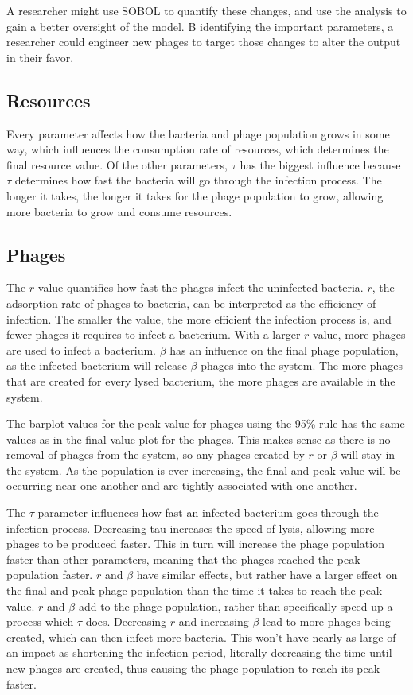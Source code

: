 A researcher might use SOBOL to quantify these changes, and use the analysis to gain a better oversight of the model. 
B identifying the important parameters, a researcher could engineer new phages to target those changes to alter the output in their favor. 

\subsection{Resources}
Every parameter affects how the bacteria and phage population grows in some way, which influences the consumption rate of resources, which determines the final resource value. 
Of the other parameters, $\tau$ has the biggest influence because $\tau$ determines how fast the bacteria will go through the infection process. 
The longer it takes, the longer it takes for the phage population to grow, allowing more bacteria to grow and consume resources. 



\subsection{Phages}
The $r$ value quantifies how fast the phages infect the uninfected bacteria. 
$r$, the adsorption rate of phages to bacteria, can be interpreted as the efficiency of infection. 
The smaller the value, the more efficient the infection process is, and fewer phages it requires to infect a bacterium. 
With a larger $r$ value, more phages are used to infect a bacterium. 
$\beta$ has an influence on the final phage population, as the infected bacterium will release $\beta$ phages into the system. 
The more phages that are created for every lysed bacterium, the more phages are available in the system. 

The barplot values for the peak value for phages using the 95\% rule has the same values as in the final value plot for the phages. 
This makes sense as there is no removal of phages from the system, so any phages created by $r$ or $\beta$ will stay in the system. 
As the population is ever-increasing, the final and peak value will be occurring near one another and are tightly associated with one another.

The $\tau$ parameter influences how fast an infected bacterium goes through the infection process. 
Decreasing tau increases the speed of lysis, allowing more phages to be produced faster. 
This in turn will increase the phage population faster than other parameters, meaning that the phages reached the peak population faster.
$r$ and $\beta$ have similar effects, but rather have a larger effect on the final and peak phage population than the time it takes to reach the peak value. 
$r$ and $\beta$ add to the phage population, rather than specifically speed up a process which $\tau$ does. 
Decreasing $r$ and increasing $\beta$ lead to more phages being created, which can then infect more bacteria. 
This won't have nearly as large of an impact as shortening the infection period, literally decreasing the time until new phages are created, thus causing the phage population to reach its peak faster. 

